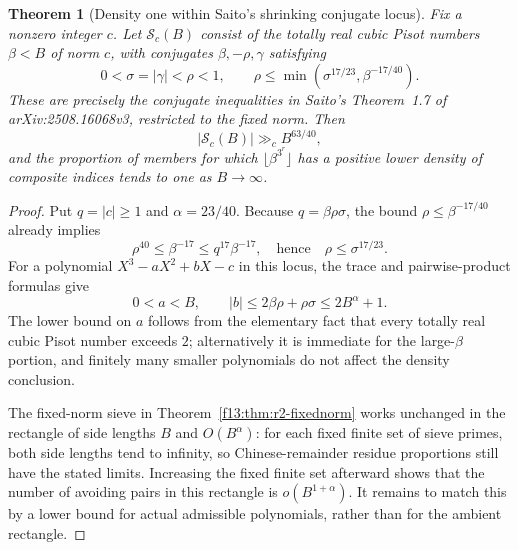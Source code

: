 \documentclass[11pt,a4paper]{article}
\newtheorem{theorem}{Theorem}[section]
\theoremstyle{definition}
\theoremstyle{remark}
\numberwithin{equation}{section}
\begin{document}
\begin{theorem}[Density one within Saito's shrinking conjugate locus]
\label{f13:thm:r2-saito-locus}
Fix a nonzero integer $c$. Let $\mathcal S_c(B)$ consist of the totally
real cubic Pisot numbers $\beta<B$ of norm $c$, with conjugates
$\beta,-\rho,\gamma$ satisfying
\[
 0<\sigma=|\gamma|<\rho<1,\qquad
 \rho\le\min(\sigma^{17/23},\beta^{-17/40}).
\]
These are precisely the conjugate inequalities in Saito's
Theorem~1.7 of arXiv:2508.16068v3, restricted to the fixed norm.
Then
\[
 |\mathcal S_c(B)|\gg_c B^{63/40},
\]
and the proportion of members for which
$\lfloor\beta^{3^r}\rfloor$ has a positive lower density of composite
indices tends to one as $B\to\infty$.
\end{theorem}
\begin{proof}
Put $q=|c|\ge1$ and $\alpha=23/40$.
Because $q=\beta\rho\sigma$, the bound
$\rho\le\beta^{-17/40}$ already implies
\[
 \rho^{40}\le\beta^{-17}\le q^{17}\beta^{-17},
 \quad\text{hence}\quad \rho\le\sigma^{17/23}.
\]
For a polynomial $X^3-aX^2+bX-c$ in this locus, the trace and
pairwise-product formulas give
\[
 0<a<B,\qquad |b|\le2\beta\rho+\rho\sigma
                  \le2B^{\alpha}+1.
\]
The lower bound on $a$ follows from the elementary fact that every
totally real cubic Pisot number exceeds $2$; alternatively it is
immediate for the large-$\beta$ portion, and finitely many smaller
polynomials do not affect the density conclusion.

The fixed-norm sieve in Theorem~\ref{f13:thm:r2-fixednorm} works unchanged
in the rectangle of side lengths $B$ and $O(B^\alpha)$: for each
fixed finite set of sieve primes, both side lengths tend to infinity,
so Chinese-remainder residue proportions still have the stated
limits. Increasing the fixed finite set afterward shows that the
number of avoiding pairs in this rectangle is $o(B^{1+\alpha})$.
It remains to match this by a lower bound for actual admissible
polynomials, rather than for the ambient rectangle.


\end{proof}
\end{document}
